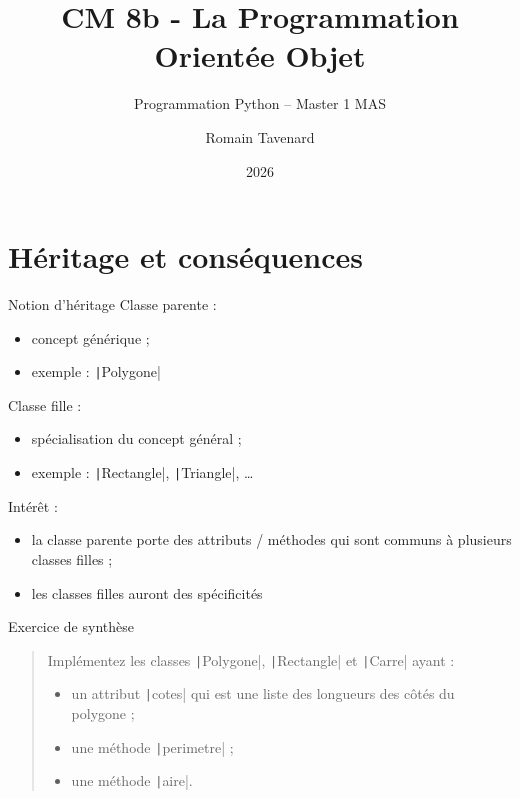\documentclass[10pt]{beamer}
\title[M1 MAS -- Python -- POO]{CM 8b - La Programmation Orientée Objet}
\subtitle{Programmation Python -- Master 1 MAS}
\author{Romain Tavenard}
\date{2026}
\institute{%
\hypersetup{urlcolor=.}
\makebox[2.2ex][c]{\faEnvelope}\enspace\href{mailto:romain.tavenard@univ-rennes2.fr}{\texttt{romain.tavenard@univ-rennes2.fr}}\\%
}
\begin{document}
\maketitle

\section{Héritage et conséquences}

\begin{frame}[fragile]{Notion d'héritage}
  Classe parente :

  \begin{itemize}
    \item concept générique ;
    \item exemple : \texttt|Polygone|
  \end{itemize}

  Classe fille :

  \begin{itemize}
    \item spécialisation du concept général ;
    \item exemple : \texttt|Rectangle|, \texttt|Triangle|, \dots
  \end{itemize}

  Intérêt :

  \begin{itemize}
    \item la classe parente porte des attributs / méthodes qui sont communs à plusieurs classes filles ;
    \item les classes filles auront des spécificités
  \end{itemize}
\end{frame}

\begin{frame}[fragile]{Exercice de synthèse}
  \begin{quote}
    Implémentez les classes \texttt|Polygone|, \texttt|Rectangle| et \texttt|Carre| ayant :
    \begin{itemize}
      \item un attribut \texttt|cotes| qui est une liste des longueurs des côtés du polygone ;
      \item une méthode \texttt|perimetre| ;
      \item une méthode \texttt|aire|.
    \end{itemize}
  \end{quote}
\end{frame}
\end{document}
